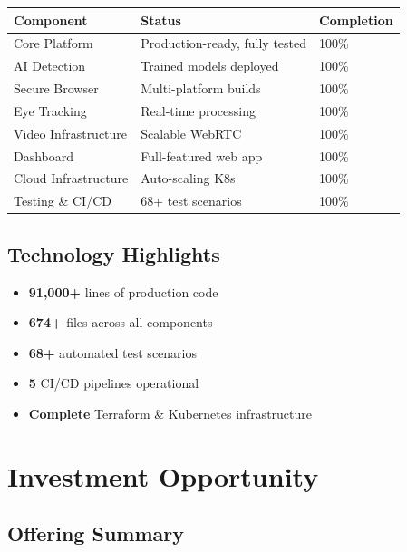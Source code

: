\documentclass[11pt,letterpaper]{article}
\begin{document}
\begin{table}[H]
\centering
\begin{tabularx}{\textwidth}{lXl}
\toprule
\textbf{Component} & \textbf{Status} & \textbf{Completion} \\
\midrule
Core Platform & Production-ready, fully tested & 100\% \\
AI Detection & Trained models deployed & 100\% \\
Secure Browser & Multi-platform builds & 100\% \\
Eye Tracking & Real-time processing & 100\% \\
Video Infrastructure & Scalable WebRTC & 100\% \\
Dashboard & Full-featured web app & 100\% \\
Cloud Infrastructure & Auto-scaling K8s & 100\% \\
Testing \& CI/CD & 68+ test scenarios & 100\% \\
\bottomrule
\end{tabularx}
\end{table}

\subsection{Technology Highlights}

\begin{itemize}[noitemsep]
    \item \textbf{91,000+} lines of production code
    \item \textbf{674+} files across all components
    \item \textbf{68+} automated test scenarios
    \item \textbf{5} CI/CD pipelines operational
    \item \textbf{Complete} Terraform \& Kubernetes infrastructure
\end{itemize}


\section{Investment Opportunity}

\subsection{Offering Summary}
\end{document}
